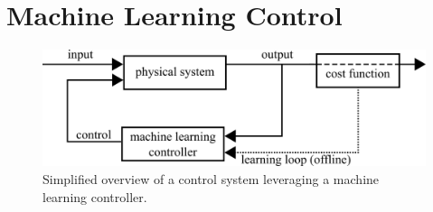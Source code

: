 \documentclass[12pt,letter]{article}
\begin{document}
	
	\setcounter{section}{11}	
	\setcounter{figure}{0}   
	\renewcommand\thefigure{\thesection.\arabic{figure}}


\section{Machine Learning Control}



		\begin{figure}[H]
			\centering
			\includegraphics[]{../figures/control_system_machine_learning}
			\caption{Simplified overview of a control system leveraging a machine learning controller.}
			\label{fig:control_system_machine_learning}
		\end{figure}
\end{document}

